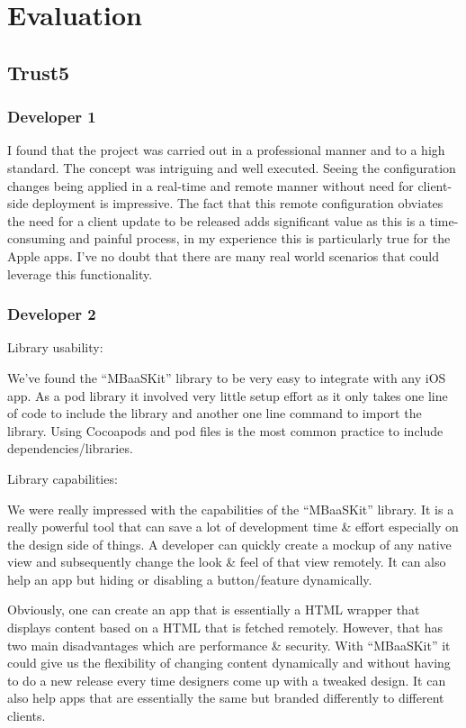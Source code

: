 \section{Evaluation}

\subsection{Trust5}

\subsubsection{Developer 1}

I found that the project was carried out in a professional manner and to a high standard. The concept was intriguing and well executed. Seeing the configuration changes being applied in a real-time and remote manner without need for client-side deployment is impressive. The fact that this remote configuration obviates the need for a client update to be released adds significant value as this is a time-consuming and painful process, in my experience this is particularly true for the Apple apps. I've no doubt that there are many real world scenarios that could leverage this functionality.

\subsubsection{Developer 2}

Library usability:

We’ve found the “MBaaSKit” library to be very easy to integrate with any iOS app. As a pod library it involved very little setup effort as it only takes one line of code to include the library and another one line command to import the library. Using Cocoapods and pod files is the most common practice to include dependencies/libraries.


Library capabilities:

We were really impressed with the capabilities of the “MBaaSKit” library. It is a really powerful tool that can save a lot of development time & effort especially on the design side of things. A developer can quickly create a mockup of any native view and subsequently change the look & feel of that view remotely. It can also help an app but hiding or disabling a button/feature dynamically.

Obviously, one can create an app that is essentially a HTML wrapper that displays content based on a HTML that is fetched remotely. However, that has two main disadvantages which are performance & security. With “MBaaSKit” it could give us the flexibility of changing content dynamically and without having to do a new release every time designers come up with a tweaked design. It can also help apps that are essentially the same but branded differently to different clients.

